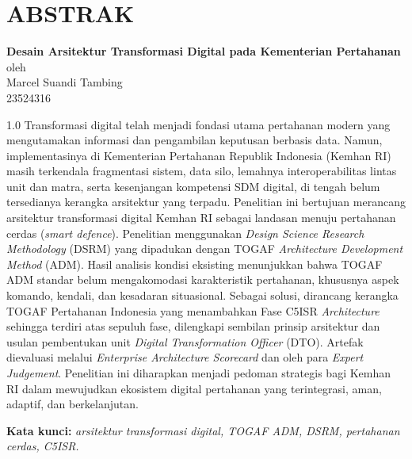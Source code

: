 \chapter*{ABSTRAK}

\begin{center}

    \textbf{Desain Arsitektur Transformasi Digital pada Kementerian Pertahanan} \\
    \vspace{0.4cm}
    oleh \\
    \vspace{0.4cm}
    Marcel Suandi Tambing\\
    23524316\\
\end{center}


\begin{spacing}{1.0}
Transformasi digital telah menjadi fondasi utama pertahanan modern yang
mengutamakan informasi dan pengambilan keputusan berbasis data. Namun,
implementasinya di Kementerian Pertahanan Republik Indonesia (Kemhan RI) masih
terkendala fragmentasi sistem, data silo, lemahnya interoperabilitas lintas unit dan
matra, serta kesenjangan kompetensi SDM digital, di tengah belum tersedianya
kerangka arsitektur yang terpadu. Penelitian ini bertujuan merancang arsitektur
transformasi digital Kemhan RI sebagai landasan menuju pertahanan cerdas
(\textit{smart defence}). Penelitian menggunakan \textit{Design Science Research Methodology}
(DSRM) yang dipadukan dengan TOGAF \textit{Architecture Development Method} (ADM).
Hasil analisis kondisi eksisting menunjukkan bahwa TOGAF ADM standar belum
mengakomodasi karakteristik pertahanan, khususnya aspek komando, kendali, dan
kesadaran situasional. Sebagai solusi, dirancang kerangka TOGAF Pertahanan
Indonesia yang menambahkan Fase C5ISR \textit{Architecture} sehingga terdiri atas sepuluh
fase, dilengkapi sembilan prinsip arsitektur dan usulan pembentukan unit
\textit{Digital Transformation Officer} (DTO). Artefak dievaluasi melalui
\textit{Enterprise Architecture Scorecard}\texttrademark{} dan oleh para \textit{Expert Judgement}.
Penelitian ini diharapkan menjadi pedoman strategis bagi Kemhan RI dalam
mewujudkan ekosistem digital pertahanan yang terintegrasi, aman, adaptif, dan
berkelanjutan.

\vspace{0.4cm}
\noindent\textbf{Kata kunci:} \textit{arsitektur transformasi digital, TOGAF ADM, DSRM, pertahanan cerdas, C5ISR.}
\end{spacing}
